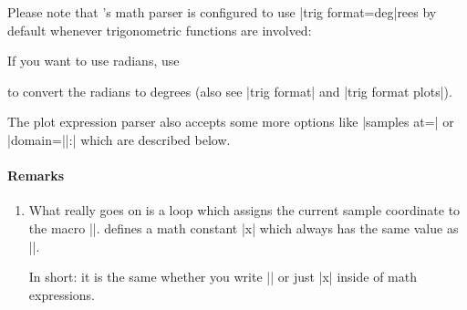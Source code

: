 {\begin{addplotoperation}[]{}{}
    Please note that \PGF's math parser is configured to use
    |trig format=deg|rees by default whenever trigonometric functions are
    involved:
\begin{codeexample}[]
\end{codeexample}
    \noindent If you want to use radians, use
\begin{codeexample}[]
\end{codeexample}
    \noindent to convert the radians to degrees (also see |trig format| and
    |trig format plots|).

    The plot expression parser also accepts some more options like
    |samples at=| or |domain=||:|
    which are described below.


    \paragraph{Remarks}

    \begin{enumerate}
        \item What really goes on is a loop which assigns the current sample
            coordinate to the macro |\x|. \PGFPlots{} defines a math constant
            |x| which always has the same value as |\x|.

            In short: it is the same whether you write |\x| or just |x| inside
            of math expressions.


\end{enumerate}
\end{addplotoperation}}

